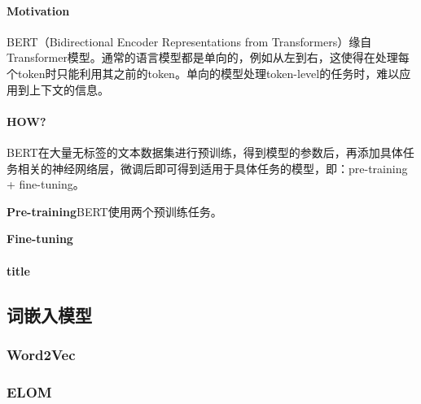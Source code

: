 \paragraph{Motivation}
BERT（Bidirectional Encoder Representations from Transformers）\cite{devlin2019bert}缘自Transformer模型。通常的语言模型都是单向的，例如从左到右，这使得在处理每个token时只能利用其之前的token。单向的模型处理token-level的任务时，难以应用到上下文的信息。

\paragraph{HOW?}
BERT在大量无标签的文本数据集进行预训练，得到模型的参数后，再添加具体任务相关的神经网络层，微调后即可得到适用于具体任务的模型，即：pre-training + fine-tuning。

\par{\textbf{Pre-training}}BERT使用两个预训练任务。

\par{\textbf{Fine-tuning}}

\paragraph{title}

\subsection{词嵌入模型}
\subsubsection{Word2Vec}

\subsubsection{ELOM}